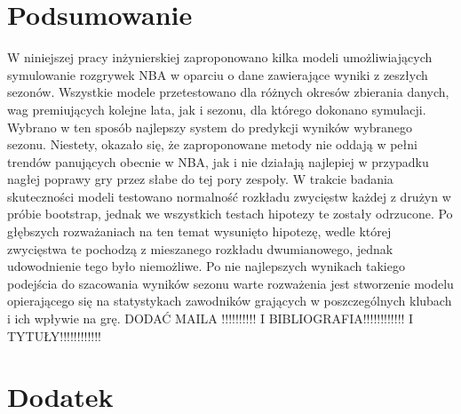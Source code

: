 \documentclass[inzynierska]{pwr_wmat_praca_dyplomowa}
\theoremstyle{plain}
\numberwithin{theorem}{chapter}
\theoremstyle{definition}
\numberwithin{theorem}{chapter}
\begin{document}
{\backmatter \chapter{Podsumowanie}}
W niniejszej pracy inżynierskiej zaproponowano kilka modeli umożliwiających symulowanie rozgrywek NBA w oparciu o dane zawierające wyniki z zeszłych sezonów. Wszystkie modele przetestowano dla różnych okresów zbierania danych, wag premiujących kolejne lata, jak i sezonu, dla którego dokonano symulacji. Wybrano w ten sposób najlepszy system do predykcji wyników wybranego sezonu. Niestety, okazało się, że zaproponowane metody nie oddają w pełni trendów panujących obecnie w NBA, jak i nie działają najlepiej w przypadku nagłej poprawy gry przez słabe do tej pory zespoły. W trakcie badania skuteczności modeli testowano normalność rozkładu zwycięstw każdej z drużyn w próbie bootstrap, jednak we wszystkich testach hipotezy te zostały odrzucone. Po głębszych rozważaniach na ten temat wysunięto hipotezę, wedle której zwycięstwa te pochodzą z mieszanego rozkładu dwumianowego, jednak udowodnienie tego było niemożliwe. Po nie najlepszych wynikach takiego podejścia do szacowania wyników sezonu warte rozważenia jest stworzenie modelu opierającego się na statystykach zawodników grających w poszczególnych klubach i ich wpływie na grę.
DODAĆ MAILA !!!!!!!!!!
I BIBLIOGRAFIA!!!!!!!!!!!!
I TYTUŁY!!!!!!!!!!!!

{\backmatter \chapter{Dodatek}}

\newpage
\end{document}
